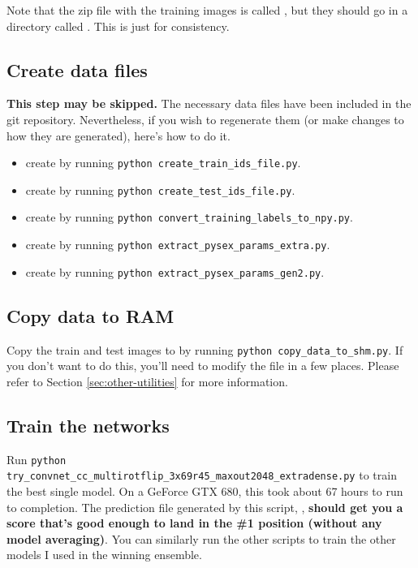 \documentclass[a4paper,10pt]{article}
\begin{document}
Note that the zip file with the training images is called , but they should go in a directory called . This is just for consistency.

\subsection{Create data files}

\textbf{This step may be skipped.} The necessary data files have been included in the git repository. Nevertheless, if you wish to regenerate them (or make changes to how they are generated), here's how to do it.

\begin{itemize}
 \item create  by running \texttt{python create\_train\_ids\_file.py}.
 \item create  by running \texttt{python create\_test\_ids\_file.py}.
 \item create  by running \texttt{python convert\_training\_labels\_to\_npy.py}.
 \item create  by running \texttt{python extract\_pysex\_params\_extra.py}.
 \item create  by running \texttt{python extract\_pysex\_params\_gen2.py}.
\end{itemize}

\subsection{Copy data to RAM}

Copy the train and test images to  by running \texttt{python copy\_data\_to\_shm.py}. If you don't want to do this, you'll need to modify the  file in a few places. Please refer to Section \ref{sec:other-utilities} for more information.

\subsection{Train the networks}

Run \texttt{python try\_convnet\_cc\_multirotflip\_3x69r45\_maxout2048\_extradense.py} to train the best single model. On a GeForce GTX 680, this took about 67 hours to run to completion. The prediction file generated by this script, , \textbf{should get you a score that's good enough to land in the \#1 position (without any model averaging)}. You can similarly run the other  scripts to train the other models I used in the winning ensemble.
\end{document}
